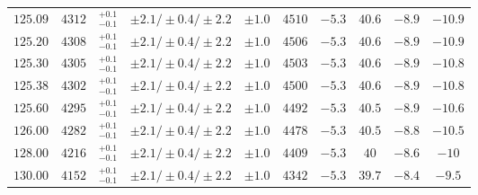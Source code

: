 \begin{table}[ht!]
\begin{center}
\begin{small}
\begin{tabular}{cccccccc|cc}
$125.09$ & $4312$ & $^{+0.1}_{-0.1}$ & $\pm 2.1/\pm 0.4/\pm 2.2$ & $\pm 1.0$ & $4510$ & $-5.3$ & $40.6$ & $-8.9$ & $-10.9$ \\
$125.20$ & $4308$ & $^{+0.1}_{-0.1}$ & $\pm 2.1/\pm 0.4/\pm 2.2$ & $\pm 1.0$ & $4506$ & $-5.3$ & $40.6$ & $-8.9$ & $-10.9$ \\
$125.30$ & $4305$ & $^{+0.1}_{-0.1}$ & $\pm 2.1/\pm 0.4/\pm 2.2$ & $\pm 1.0$ & $4503$ & $-5.3$ & $40.6$ & $-8.9$ & $-10.8$ \\
$125.38$ & $4302$ & $^{+0.1}_{-0.1}$ & $\pm 2.1/\pm 0.4/\pm 2.2$ & $\pm 1.0$ & $4500$ & $-5.3$ & $40.6$ & $-8.9$ & $-10.8$ \\
$125.60$ & $4295$ & $^{+0.1}_{-0.1}$ & $\pm 2.1/\pm 0.4/\pm 2.2$ & $\pm 1.0$ & $4492$ & $-5.3$ & $40.5$ & $-8.9$ & $-10.6$ \\
$126.00$ & $4282$ & $^{+0.1}_{-0.1}$ & $\pm 2.1/\pm 0.4/\pm 2.2$ & $\pm 1.0$ & $4478$ & $-5.3$ & $40.5$ & $-8.8$ & $-10.5$ \\
$128.00$ & $4216$ & $^{+0.1}_{-0.1}$ & $\pm 2.1/\pm 0.4/\pm 2.2$ & $\pm 1.0$ & $4409$ & $-5.3$ & $40  $ & $-8.6$ & $-10  $ \\
$130.00$ & $4152$ & $^{+0.1}_{-0.1}$ & $\pm 2.1/\pm 0.4/\pm 2.2$ & $\pm 1.0$ & $4342$ & $-5.3$ & $39.7$ & $-8.4$ & $-9.5 $ \\
\bottomrule
\end{tabular}%
\end{small}%
\end{center}%
\end{table}












































